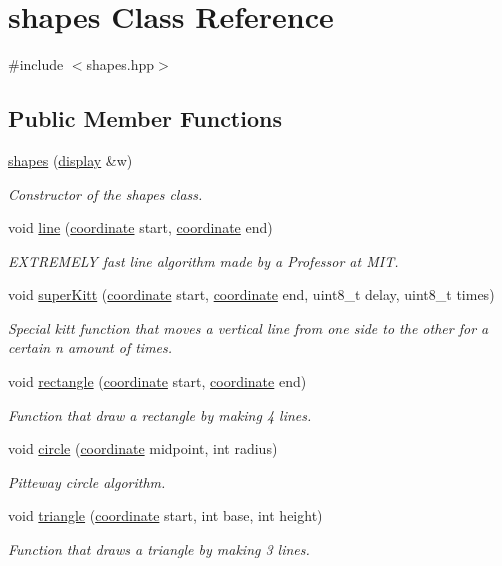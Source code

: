 \hypertarget{classshapes}{}\section{shapes Class Reference}
\label{classshapes}


{\ttfamily \#include $<$shapes.\+hpp$>$}

\subsection*{Public Member Functions}
\begin{DoxyCompactItemize}
\item 
\hyperlink{classshapes_a61a7ba5ffd8f704b42f61a01f35ee653}{shapes} (\hyperlink{classdisplay}{display} \&w)
\begin{DoxyCompactList}\small\item\em Constructor of the shapes class. \end{DoxyCompactList}\item 
void \hyperlink{classshapes_a159e2c9aac754341cb42cc4173175bb7}{line} (\hyperlink{classcoordinate}{coordinate} start, \hyperlink{classcoordinate}{coordinate} end)
\begin{DoxyCompactList}\small\item\em E\+X\+T\+R\+E\+M\+E\+LY fast line algorithm made by a Professor at M\+IT. \end{DoxyCompactList}\item 
void \hyperlink{classshapes_aceaca21ee5cc452fe206335c18ae49eb}{super\+Kitt} (\hyperlink{classcoordinate}{coordinate} start, \hyperlink{classcoordinate}{coordinate} end, uint8\+\_\+t delay, uint8\+\_\+t times)
\begin{DoxyCompactList}\small\item\em Special kitt function that moves a vertical line from one side to the other for a certain n amount of times. \end{DoxyCompactList}\item 
void \hyperlink{classshapes_a129d716caf5f38d1bed560590e9b7bbc}{rectangle} (\hyperlink{classcoordinate}{coordinate} start, \hyperlink{classcoordinate}{coordinate} end)
\begin{DoxyCompactList}\small\item\em Function that draw a rectangle by making 4 lines. \end{DoxyCompactList}\item 
void \hyperlink{classshapes_a7da31426ad907ab181bd862a3f9789c9}{circle} (\hyperlink{classcoordinate}{coordinate} midpoint, int radius)
\begin{DoxyCompactList}\small\item\em Pitteway circle algorithm. \end{DoxyCompactList}\item 
void \hyperlink{classshapes_acbc5439aa59f0eea17e166eb21163b7c}{triangle} (\hyperlink{classcoordinate}{coordinate} start, int base, int height)
\begin{DoxyCompactList}\small\item\em Function that draws a triangle by making 3 lines. \end{DoxyCompactList}\end{DoxyCompactItemize}


